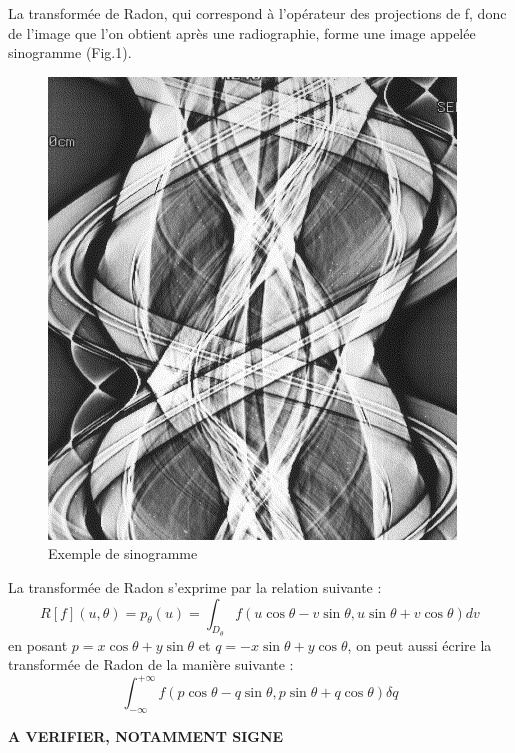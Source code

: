 \documentclass[conference]{IEEEtran}
\begin{document}
La transformée de Radon, qui correspond à l'opérateur des projections de f, donc de l'image que l'on obtient après une radiographie, forme une image appelée sinogramme (Fig.1). 

\begin{figure}[H]
\centering
\includegraphics[scale=0.4]{sinogrammeExemple}
\caption[Exemple de sinogramme]{Exemple de sinogramme}
\label{fig:gallery}
\end{figure}

La transformée de Radon s'exprime par la relation suivante :
\[R[f](u,\theta)=p_\theta(u)
=\int_{D_\theta} f(u\cos\theta-v\sin\theta, u\sin\theta+v\cos\theta)dv\]
en posant $p=x\cos\theta+y\sin\theta$ et $q=-x\sin\theta+y\cos\theta$, on peut aussi écrire la transformée de Radon de la manière suivante : \[\int_{-\infty}^{+\infty} f(p\cos\theta-q\sin\theta, p\sin\theta+q\cos\theta)\delta q\]

\textbf{A VERIFIER, NOTAMMENT SIGNE}
\end{document}
